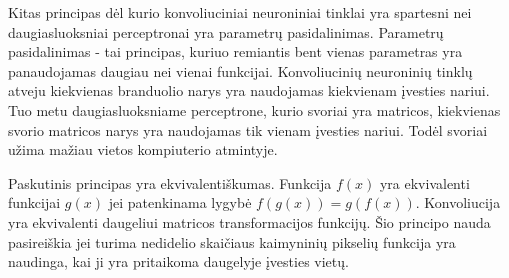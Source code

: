 Kitas principas dėl kurio konvoliuciniai neuroniniai tinklai yra spartesni nei daugiasluoksniai perceptronai yra parametrų pasidalinimas. Parametrų pasidalinimas - tai principas, kuriuo remiantis bent vienas parametras yra panaudojamas daugiau nei vienai funkcijai. Konvoliucinių neuroninių tinklų atveju kiekvienas branduolio narys yra naudojamas kiekvienam įvesties nariui. Tuo metu daugiasluoksniame perceptrone, kurio svoriai yra matricos, kiekvienas svorio matricos narys yra naudojamas tik vienam įvesties nariui. Todėl svoriai užima mažiau vietos kompiuterio atmintyje.

Paskutinis principas yra ekvivalentiškumas. Funkcija $f(x)$ yra ekvivalenti funkcijai $g(x)$ jei patenkinama lygybė $f(g(x)) = g(f(x))$. Konvoliucija yra ekvivalenti daugeliui matricos transformacijos funkcijų. Šio principo nauda pasireiškia jei turima nedidelio skaičiaus kaimyninių pikselių funkcija yra naudinga, kai ji yra pritaikoma daugelyje įvesties vietų.
